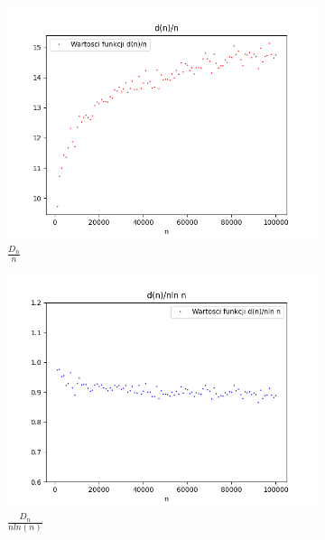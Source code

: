 \documentclass{report}
\begin{document}
    \begin{figure}[H]
        \centering
        \begin{subfigure}{.5\textwidth}
          \centering
          \includegraphics[width=1.1\linewidth]{plotdnfunc1.png}
          \caption{\( \frac{D_n}{n} \)}
          \label{fig:plotdnfunc1}
        \end{subfigure}%
        \begin{subfigure}{.5\textwidth}
          \centering
          \includegraphics[width=1.1\linewidth]{plotdnfunc2.png}
          \caption{\( \frac{D_n}{nln(n)} \)}
          \label{fig:plotdnfunc2}
        \end{subfigure}
        \begin{subfigure}{.5\textwidth}

\end{subfigure}
\end{figure}
\end{document}
